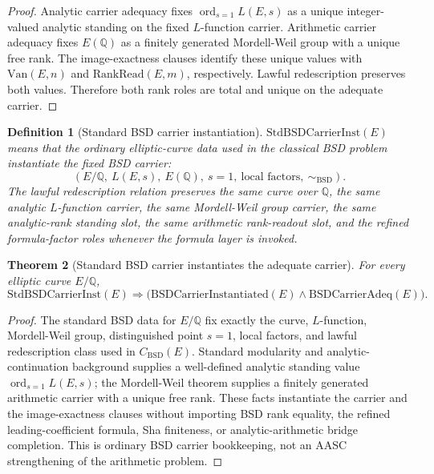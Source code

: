 \documentclass[11pt]{article}
\newtheorem{theorem}{Theorem}[section]
\newtheorem{definition}[theorem]{Definition}
\newcommand{\Q}{\mathbb{Q}}
\newcommand{\ord}{\operatorname{ord}}
\newcommand{\BSD}{\mathrm{BSD}}
\newcommand{\Van}{\mathrm{Van}}
\newcommand{\RankRead}{\mathrm{RankRead}}
\begin{document}
\begin{proof}
Analytic carrier adequacy fixes $\ord_{s=1}L(E,s)$ as a unique integer-valued analytic standing on the fixed $L$-function carrier. Arithmetic carrier adequacy fixes $E(\Q)$ as a finitely generated Mordell-Weil group with a unique free rank. The image-exactness clauses identify these unique values with $\Van(E,n)$ and $\RankRead(E,m)$, respectively. Lawful redescription preserves both values. Therefore both rank roles are total and unique on the adequate carrier.
\end{proof}

\begin{definition}[Standard BSD carrier instantiation]
$\mathrm{StdBSDCarrierInst}(E)$ means that the ordinary elliptic-curve data used in the classical BSD problem instantiate the fixed BSD carrier:
\[
(E/\Q,\ L(E,s),\ E(\Q),\ s=1,\ \text{local factors},\ \sim_{\BSD}).
\]
The lawful redescription relation preserves the same curve over $\Q$, the same analytic $L$-function carrier, the same Mordell-Weil group carrier, the same analytic-rank standing slot, the same arithmetic rank-readout slot, and the refined formula-factor roles whenever the formula layer is invoked.
\end{definition}

\begin{theorem}[Standard BSD carrier instantiates the adequate carrier]\label{thm:standard-carrier-instantiates}
For every elliptic curve $E/\Q$,
\[
\mathrm{StdBSDCarrierInst}(E)\Rightarrow
\bigl(\mathrm{BSDCarrierInstantiated}(E)\wedge\mathrm{BSDCarrierAdeq}(E)\bigr).
\]
\end{theorem}

\begin{proof}
The standard BSD data for $E/\Q$ fix exactly the curve, $L$-function, Mordell-Weil group, distinguished point $s=1$, local factors, and lawful redescription class used in $C_{\BSD}(E)$. Standard modularity and analytic-continuation background supplies a well-defined analytic standing value $\ord_{s=1}L(E,s)$; the Mordell-Weil theorem supplies a finitely generated arithmetic carrier with a unique free rank. These facts instantiate the carrier and the image-exactness clauses without importing BSD rank equality, the refined leading-coefficient formula, Sha finiteness, or analytic-arithmetic bridge completion. This is ordinary BSD carrier bookkeeping, not an AASC strengthening of the arithmetic problem.
\end{proof}
\end{document}
